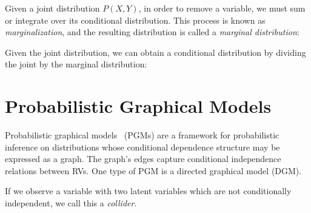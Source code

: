 \documentclass{article}
\begin{document}
Given a joint distribution $P(X, Y)$, in order to remove a variable, we must sum or integrate over its conditional distribution. This process is known as \textit{marginalization}, and the resulting distribution is called a \textit{marginal distribution}:

\begin{prooftree}
\end{prooftree}

Given the joint distribution, we can obtain a conditional distribution by dividing the joint by the marginal distribution:

\begin{prooftree}
\end{prooftree}

\section{Probabilistic Graphical Models}

Probabilistic graphical models~\citep{jordan2003introduction,koller2009probabilistic} (PGMs) are a framework for probabilistic inference on distributions whose conditional dependence structure may be expressed as a graph. The graph's edges capture conditional independence relations between RVs. One type of PGM is a directed graphical model (DGM).

If we observe a variable with two latent variables which are not conditionally independent, we call this a \textit{collider}.

\begin{prooftree}
\end{prooftree}
\end{document}
